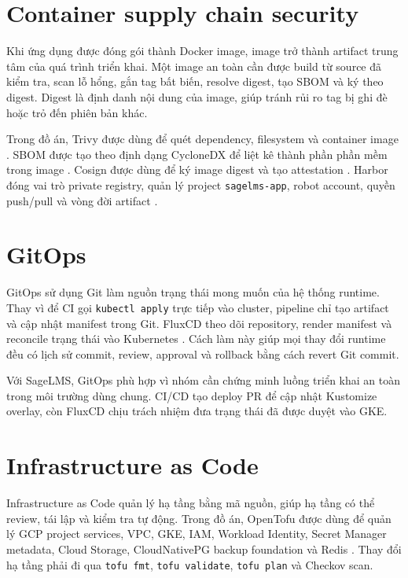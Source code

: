 \section{Container supply chain security}

Khi ứng dụng được đóng gói thành Docker image, image trở thành artifact trung tâm của quá trình triển khai. Một image an toàn cần được build từ source đã kiểm tra, scan lỗ hổng, gắn tag bất biến, resolve digest, tạo SBOM và ký theo digest. Digest là định danh nội dung của image, giúp tránh rủi ro tag bị ghi đè hoặc trỏ đến phiên bản khác.

Trong đồ án, Trivy được dùng để quét dependency, filesystem và container image \cite{trivy}. SBOM được tạo theo định dạng CycloneDX để liệt kê thành phần phần mềm trong image \cite{cyclonedx}. Cosign được dùng để ký image digest và tạo attestation \cite{cosign}. Harbor đóng vai trò private registry, quản lý project \texttt{sagelms-app}, robot account, quyền push/pull và vòng đời artifact \cite{harbor}.

\section{GitOps}

GitOps sử dụng Git làm nguồn trạng thái mong muốn của hệ thống runtime. Thay vì để CI gọi \texttt{kubectl apply} trực tiếp vào cluster, pipeline chỉ tạo artifact và cập nhật manifest trong Git. FluxCD theo dõi repository, render manifest và reconcile trạng thái vào Kubernetes \cite{fluxcd}. Cách làm này giúp mọi thay đổi runtime đều có lịch sử commit, review, approval và rollback bằng cách revert Git commit.

Với SageLMS, GitOps phù hợp vì nhóm cần chứng minh luồng triển khai an toàn trong môi trường dùng chung. CI/CD tạo deploy PR để cập nhật Kustomize overlay, còn FluxCD chịu trách nhiệm đưa trạng thái đã được duyệt vào GKE.

\section{Infrastructure as Code}

Infrastructure as Code quản lý hạ tầng bằng mã nguồn, giúp hạ tầng có thể review, tái lập và kiểm tra tự động. Trong đồ án, OpenTofu được dùng để quản lý GCP project services, VPC, GKE, IAM, Workload Identity, Secret Manager metadata, Cloud Storage, CloudNativePG backup foundation và Redis \cite{opentofu}. Thay đổi hạ tầng phải đi qua \texttt{tofu fmt}, \texttt{tofu validate}, \texttt{tofu plan} và Checkov scan.

